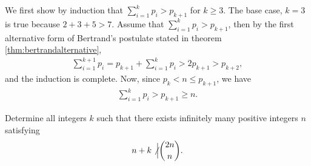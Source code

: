 \documentclass{subfile}
\begin{document}
	\begin{solution}
		We first show by induction that $\sum_{i=1}^{k} p_i > p_{k+1}$ for $k \geq 3$. The base case, $k=3$ is true because $2+3+5>7$. Assume that $\sum_{i=1}^{k} p_i > p_{k+1}$, then by the first alternative form of Bertrand's postulate stated in theorem \eqref{thm:bertrandalternative},
			\begin{align*}
				\sum_{i=1}^{k+1} p_i = p_{k+1} + \sum_{i=1}^k p_i > 2p_{k+1} > p_{k+2},
			\end{align*}
		and the induction is complete. Now, since $p_k<n\leq p_{k+1}$, we have
			\begin{align*}
				\sum_{i=1}^k p_i > p_{k+1} \geq n.
			\end{align*}
	\end{solution}
	
	\begin{problem}[China 2015]\label{prob:china2015-bertrand}
		Determine all integers $k$ such that there exists infinitely many positive integers $n$ satisfying
		\begin{align*}
		n+k \not \Big| \binom{2n}{n}.
		\end{align*}
	\end{problem}
	
\end{document}
